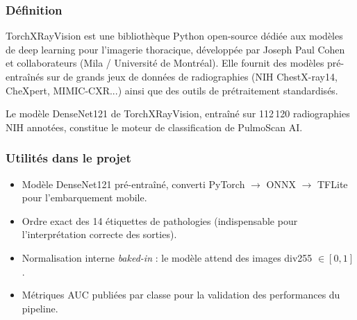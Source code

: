 \documentclass[12pt,a4paper]{report}
\begin{document}
\noindent\begin{minipage}[t]{0.66\textwidth}
\subsubsection*{Définition}
TorchXRayVision est une bibliothèque Python open-source dédiée aux modèles de deep learning pour l'imagerie thoracique, développée par Joseph Paul Cohen et collaborateurs (Mila / Université de Montréal). Elle fournit des modèles pré-entraînés sur de grands jeux de données de radiographies (NIH ChestX-ray14, CheXpert, MIMIC-CXR...) ainsi que des outils de prétraitement standardisés.

Le modèle DenseNet121 de TorchXRayVision, entraîné sur 112\,120 radiographies NIH annotées, constitue le moteur de classification de PulmoScan AI.
\end{minipage}\hfill
\begin{minipage}[t]{0.30\textwidth}
\vspace{0pt}
\begin{center}
\end{center}
\end{minipage}

\subsubsection*{Utilités dans le projet}
\begin{itemize}
  \item Modèle DenseNet121 pré-entraîné, converti PyTorch $\rightarrow$ ONNX $\rightarrow$ TFLite pour l'embarquement mobile.
  \item Ordre exact des 14 étiquettes de pathologies (indispensable pour l'interprétation correcte des sorties).
  \item Normalisation interne \textit{baked-in} : le modèle attend des images div255 $\in [0,1]$.
  \item Métriques AUC publiées par classe pour la validation des performances du pipeline.
\end{itemize}
\end{document}
